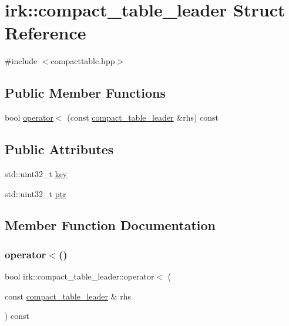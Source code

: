\hypertarget{structirk_1_1compact__table__leader}{}\section{irk\+:\+:compact\+\_\+table\+\_\+leader Struct Reference}
\label{structirk_1_1compact__table__leader}


{\ttfamily \#include $<$compacttable.\+hpp$>$}

\subsection*{Public Member Functions}
\begin{DoxyCompactItemize}
\item 
bool \mbox{\hyperlink{structirk_1_1compact__table__leader_ad96c038f67cec0df810807785ff0b175}{operator$<$}} (const \mbox{\hyperlink{structirk_1_1compact__table__leader}{compact\+\_\+table\+\_\+leader}} \&rhs) const
\end{DoxyCompactItemize}
\subsection*{Public Attributes}
\begin{DoxyCompactItemize}
\item 
std\+::uint32\+\_\+t \mbox{\hyperlink{structirk_1_1compact__table__leader_a250e11134b95bb0f559c531a56a548c5}{key}}
\item 
std\+::uint32\+\_\+t \mbox{\hyperlink{structirk_1_1compact__table__leader_aeeb27531e59da3a9be21627117fa0af3}{ptr}}
\end{DoxyCompactItemize}


\subsection{Member Function Documentation}
\mbox{\label{structirk_1_1compact__table__leader_ad96c038f67cec0df810807785ff0b175}} 
\subsubsection{\texorpdfstring{operator$<$()}{operator<()}}
{\footnotesize\ttfamily bool irk\+::compact\+\_\+table\+\_\+leader\+::operator$<$ (\begin{DoxyParamCaption}\item[{const \mbox{\hyperlink{structirk_1_1compact__table__leader}{compact\+\_\+table\+\_\+leader}} \&}]{rhs }\end{DoxyParamCaption}) const\hspace{0.3cm}{\ttfamily [inline]}}




